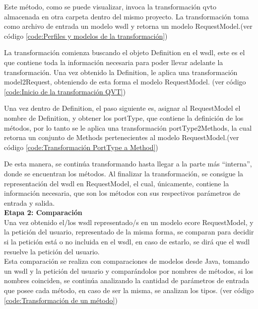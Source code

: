 

Este método, como se puede visualizar, invoca la transformación qvto almacenada en otra carpeta dentro del mismo proyecto. La transformación toma como archivo de entrada un modelo wsdl y retorna un modelo RequestModel.(ver código \ref{code:Perfiles y modelos de la transformación})




La transformación comienza buscando el objeto Definition en el wsdl, este es el que contiene toda la información necesaria para poder llevar adelante la transformación. Una vez obtenido la Definition, le aplica una transformación model2Request, obteniendo de esta forma el modelo RequestModel. (ver código \ref{code:Inicio de la transformación QVT})



Una vez dentro de Definition, el paso siguiente es,  asignar al RequestModel el nombre de Definition, y obtener los portType, que contiene la definición de los métodos, por lo tanto se le aplica una transformación portType2Methods, la cual retorna un conjunto de Methods pertenecientes al modelo RequestModel.(ver código \ref{code:Transformación PortType a Method})



De esta manera, se continúa transformando hasta llegar a la parte más “interna”, donde se encuentran los métodos.  Al finalizar la transformación, se consigue la representación del wsdl en RequestModel, el cual, únicamente, contiene la información necesaria, que son los métodos con sus respectivos parámetros de entrada y salida.\\

\textbf{Etapa 2: Comparación}\\

Una vez obtenido el/los wsdl representado/s en un modelo ecore RequestModel, y la petición del usuario, representado de la misma forma, se comparan para decidir si la petición está o no incluida en el wsdl, en caso de estarlo, se dirá que el wsdl resuelve la petición del usuario.\\
Esta comparación se realiza con comparaciones de modelos desde Java, tomando un wsdl y la petición del usuario y comparándolos por nombres de métodos, si los nombres coinciden, se continúa analizando la cantidad de parámetros de entrada que posee cada método, en caso de ser la misma, se analizan los tipos.  (ver código \ref{code:Transformación de un método})

